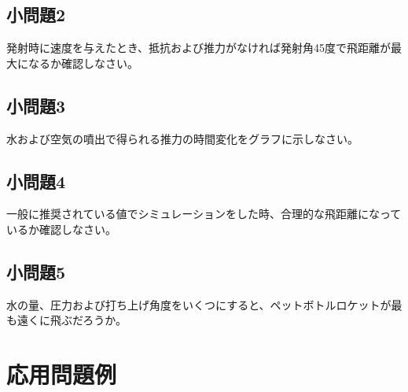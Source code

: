 \documentclass{article}
\begin{document}
\subsection{ 小問題2 }

発射時に速度を与えたとき、抵抗および推力がなければ発射角45度で飛距離が最大になるか確認しなさい。

\subsection{ 小問題3 }

水および空気の噴出で得られる推力の時間変化をグラフに示しなさい。

\subsection{ 小問題4 }

一般に推奨されている値でシミュレーションをした時、合理的な飛距離になっているか確認しなさい。

\subsection{ 小問題5 }

水の量、圧力および打ち上げ角度をいくつにすると、ペットボトルロケットが最も遠くに飛ぶだろうか。

\section{ 応用問題例 }
\end{document}
